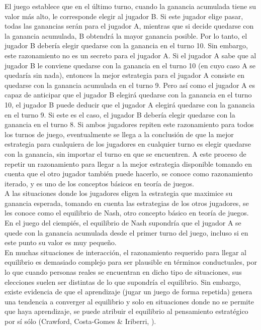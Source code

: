 El juego establece que en el último turno, cuando la ganancia acumulada tiene su valor más alto, le corresponde elegir al jugador B. Si este jugador elige pasar, todas las ganancias serán para el jugador A, mientras que si decide quedarse con la ganancia acumulada, B obtendrá la mayor ganancia posible. Por lo tanto, el jugador B debería elegir quedarse con la ganancia en el turno 10. Sin embargo, este razonamiento no es un secreto para el jugador A. Si el jugador A sabe que al jugador B le conviene quedarse con la ganancia en el turno 10 (en cuyo caso A se quedaría sin nada), entonces la mejor estrategia para el jugador A consiste en quedarse con la ganancia acumulada en el turno 9. Pero así como el jugador A es capaz de anticipar que el jugador B elegirá quedarse con la ganancia en el turno 10, el jugador B puede deducir que el jugador A elegirá quedarse con la ganancia en el turno 9. Si este es el caso, el jugador B debería elegir quedarse con la ganancia en el turno 8. Si ambos jugadores repiten este razonamiento para todos los turnos de juego, eventualmente se llega a la conclusión de que la mejor estrategia para cualquiera de los jugadores en cualquier turno es elegir quedarse con la ganancia, sin importar el turno en que se encuentren. A este proceso de repetir un razonamiento para llegar a la mejor estrategia disponible tomando en cuenta que el otro jugador también puede hacerlo, se conoce como razonamiento iterado, y es uno de los conceptos básicos en teoría de juegos.\\

A las situaciones donde los jugadores eligen la estrategia que maximice su ganancia esperada, tomando en cuenta las estrategias de los otros jugadores, se les conoce como el equilibrio de Nash, otro concepto básico en teoría de juegos. En el juego del ciempiés, el equilibrio de Nash supondría que el jugador A se quede con la ganancia acumulada desde el primer turno del juego, incluso si en este punto su valor es muy pequeño.\\

En muchas situaciones de interacción, el razonamiento requerido para llegar al equilibrio es demasiado complejo para ser plausible en términos conductuales, por lo que cuando personas reales se encuentran en dicho tipo de situaciones, sus elecciones suelen ser distintas de lo que supondría el equilibrio. Sin embargo, existe evidencia de que el aprendizaje (jugar un juego de forma repetida) genera una tendencia a converger al equilibrio y solo en situaciones donde no se permite que haya aprendizaje, se puede atribuir el equilibrio al pensamiento estratégico por sí sólo (Crawford, Costa-Gomes & Iriberri, \citeyear{Crawford}).\\

